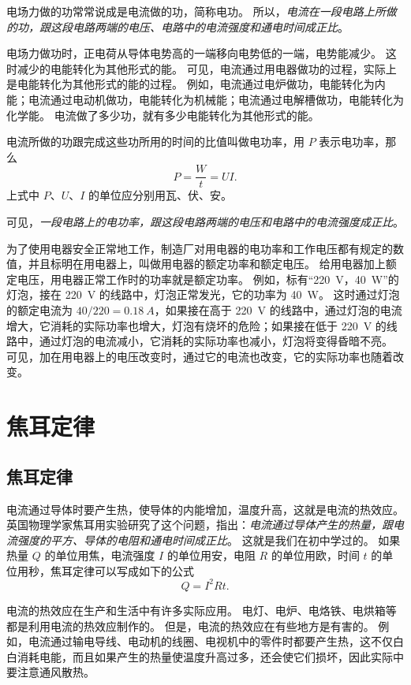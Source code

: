 电场力做的功常常说成是电流做的功，简称电功。
所以，\emph{电流在一段电路上所做的功，跟这段电路两端的电压、电路中的电流强度和通电时间成正比}。

电场力做功时，正电荷从导体电势高的一端移向电势低的一端，电势能减少。
这时减少的电能转化为其他形式的能。
可见，电流通过用电器做功的过程，实际上是电能转化为其他形式的能的过程。
例如，电流通过电炉做功，电能转化为内能；电流通过电动机做功，电能转化为机械能；电流通过电解槽做功，电能转化为化学能。
电流做了多少功，就有多少电能转化为其他形式的能。

电流所做的功跟完成这些功所用的时间的比值叫做电功率，用 $P$ 表示电功率，那么
\[P=\frac{W}{t}=UI.\]
上式中 $P$、$U$、$I$ 的单位应分别用瓦、伏、安。

可见，\emph{一段电路上的电功率，跟这段电路两端的电压和电路中的电流强度成正比}。

为了使用电器安全正常地工作，制造厂对用电器的电功率和工作电压都有规定的数值，并且标明在用电器上，叫做用电器的额定功率和额定电压。
给用电器加上额定电压，用电器正常工作时的功率就是额定功率。
例如，标有“\qty{220}{V}，\qty{40}{W}”的灯泡，接在 \qty{220}{V} 的线路中，灯泡正常发光，它的功率为 \qty{40}{W}。
这时通过灯泡的额定电流为 $40/220=\qty{0.18}{A}$，如果接在高于 \qty{220}{V} 的线路中，通过灯泡的电流增大，它消耗的实际功率也增大，灯泡有烧坏的危险；如果接在低于 \qty{220}{V} 的线路中，通过灯泡的电流减小，它消耗的实际功率也减小，灯泡将变得昏暗不亮。
可见，加在用电器上的电压改变时，通过它的电流也改变，它的实际功率也随着改变。

\section{焦耳定律}
\subsection{焦耳定律}
电流通过导体时要产生热，使导体的内能增加，温度升高，这就是电流的热效应。
英国物理学家焦耳用实验研究了这个问题，指出：\emph{电流通过导体产生的热量，跟电流强度的平方、导体的电阻和通电时间成正比}。
这就是我们在初中学过的。
如果热量 $Q$ 的单位用焦，电流强度 $I$ 的单位用安，电阻 $R$ 的单位用欧，时间 $t$ 的单位用秒，焦耳定律可以写成如下的公式
\[Q=I^2Rt.\]

电流的热效应在生产和生活中有许多实际应用。
电灯、电炉、电烙铁、电烘箱等都是利用电流的热效应制作的。
但是，电流的热效应在有些地方是有害的。
例如，电流通过输电导线、电动机的线圈、电视机中的零件时都要产生热，这不仅白白消耗电能，而且如果产生的热量使温度升高过多，还会使它们损坏，因此实际中要注意通风散热。

